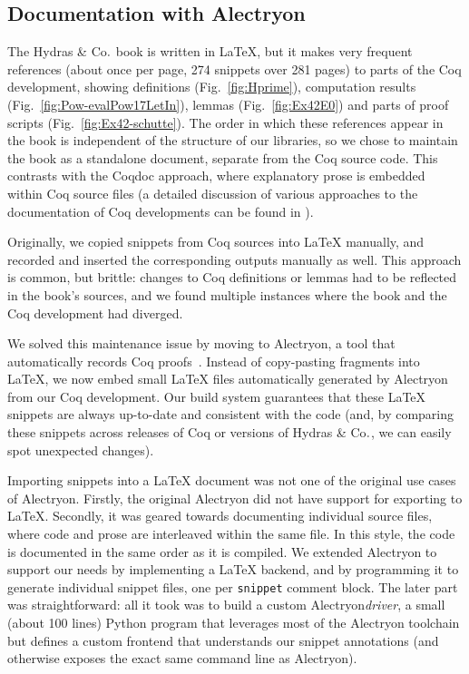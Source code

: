 \documentclass{easychair}
\newcommand{\coq}{Coq\xspace}
\newcommand{\alectr}{Alectryon\xspace}
\newcommand{\Hydras}{Hydras \& Co$\text.$\xspace}
\begin{document}
\subsection{Documentation with \alectr}

The \Hydras book is written in LaTeX, but it makes very frequent references (about once per page, 274 snippets over 281 pages) to parts of the \coq development, showing definitions (Fig.~\ref{fig:Hprime}), computation results (Fig.~\ref{fig:Pow-evalPow17LetIn}), lemmas (Fig.~\ref{fig:Ex42E0}) and parts of  proof scripts (Fig.~\ref{fig:Ex42-schutte}). The order in which these references appear in the book is independent of the structure of our libraries, so we chose to maintain the book as a standalone document, separate from the \coq source code.  This  contrasts with the Coqdoc approach, where explanatory prose is embedded within \coq source files (a detailed discussion of various approaches to the documentation of \coq developments can be found  in \cite{alectryonpaper}).

Originally, we copied snippets from \coq sources into LaTeX manually, and recorded and inserted the corresponding outputs manually as well.  This approach is common, but brittle: changes to \coq definitions or lemmas had to be reflected in the book's sources, and we found multiple instances where the book and the \coq development had diverged.
 
We solved this maintenance issue by moving to \alectr, a tool that automatically records \coq proofs~\cite{alectryongithub}.  Instead of copy-pasting fragments into LaTeX, we now embed small LaTeX files automatically generated by \alectr from our \coq development.  Our build system guarantees that these LaTeX snippets are always up-to-date and consistent with the code (and, by comparing these snippets across releases of \coq or versions of \Hydras, we can easily spot unexpected changes).

Importing snippets into a LaTeX document was not one of the original use cases of Alectryon. Firstly, the original Alectryon did not have support for exporting to LaTeX. Secondly, it was geared towards documenting individual source files, where code and prose are interleaved within the same file. In this style, the code is documented in the same order as it is compiled.
We extended \alectr to support our needs by implementing a LaTeX backend, and by programming it to generate individual snippet files, one per \texttt{snippet} comment block.  The later part was straightforward: all it took was to build a custom \alectr \textit{driver}, a small (about 100 lines) Python program that leverages most of the \alectr toolchain but defines a custom frontend that understands our snippet annotations (and otherwise exposes the exact same command line as \alectr).
\end{document}
